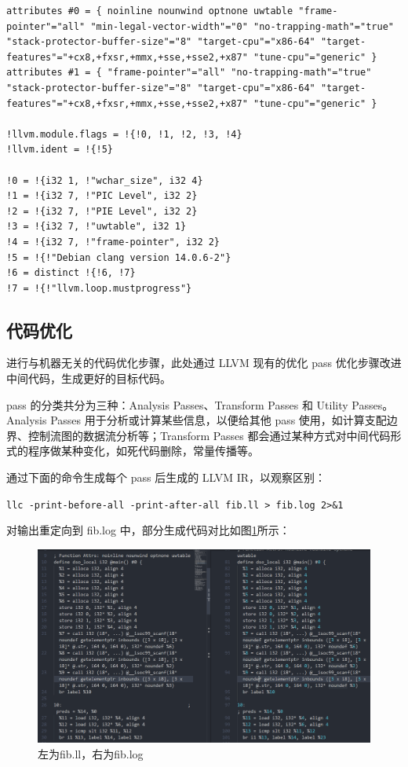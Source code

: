 \documentclass[UTF8,a4paper,10pt]{ctexart}
\begin{document}
\begin{verbatim}
attributes #0 = { noinline nounwind optnone uwtable "frame-pointer"="all" "min-legal-vector-width"="0" "no-trapping-math"="true" "stack-protector-buffer-size"="8" "target-cpu"="x86-64" "target-features"="+cx8,+fxsr,+mmx,+sse,+sse2,+x87" "tune-cpu"="generic" }
attributes #1 = { "frame-pointer"="all" "no-trapping-math"="true" "stack-protector-buffer-size"="8" "target-cpu"="x86-64" "target-features"="+cx8,+fxsr,+mmx,+sse,+sse2,+x87" "tune-cpu"="generic" }

!llvm.module.flags = !{!0, !1, !2, !3, !4}
!llvm.ident = !{!5}

!0 = !{i32 1, !"wchar_size", i32 4}
!1 = !{i32 7, !"PIC Level", i32 2}
!2 = !{i32 7, !"PIE Level", i32 2}
!3 = !{i32 7, !"uwtable", i32 1}
!4 = !{i32 7, !"frame-pointer", i32 2}
!5 = !{!"Debian clang version 14.0.6-2"}
!6 = distinct !{!6, !7}
!7 = !{!"llvm.loop.mustprogress"}

\end{verbatim}

\subsection{代码优化}
进行与机器无关的代码优化步骤，此处通过 LLVM 现有的优化 pass 优化步骤改进中间代码，生成更好的目标代码。

pass 的分类共分为三种：Analysis Passes、Transform Passes 和 Utility Passes。Analysis Passes 用于分析或计算某些信息，以便给其他 pass 使用，如计算支配边界、控制流图的数据流分析等；Transform Passes 都会通过某种方式对中间代码形式的程序做某种变化，如死代码删除，常量传播等。

通过下面的命令生成每个 pass 后生成的 LLVM IR，以观察区别：

\verb|llc -print-before-all -print-after-all fib.ll > fib.log 2>&1|

对输出重定向到 fib.log 中，部分生成代码对比如图\ref{pic:5}所示：
\begin{figure}[H]
  \centering
  \includegraphics[width=\textwidth]{figure/diff2.png}
  \caption{左为fib.ll，右为fib.log}
  \label{pic:5}
\end{figure}
\end{document}
